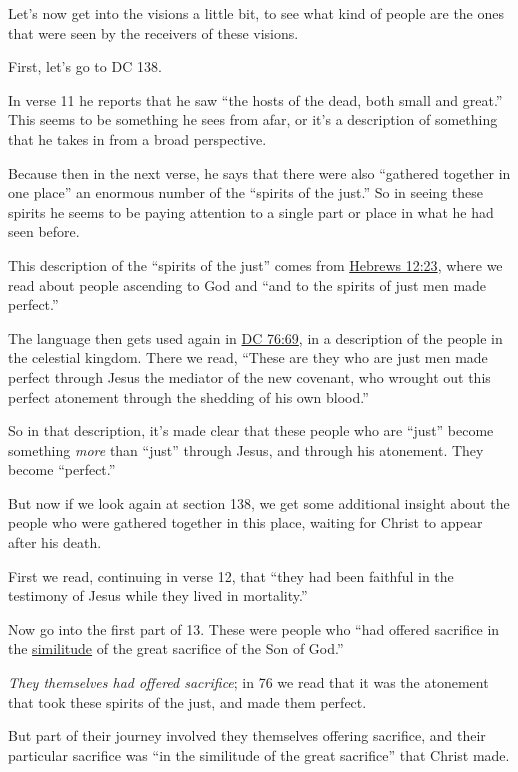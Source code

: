 \begin{compactitem}
			\item Let's now get into the visions a little bit, to see what kind of people are the ones that were seen by the receivers of these visions.
				\begin{compactitem}
					\item First, let's go to DC 138. 
					\item In verse 11 he reports that he saw ``the hosts of the dead, both small and great.'' This seems to be something he sees from afar, or it's a description of something that he takes in from a broad perspective.
					\item Because then in the next verse, he says that there were also ``gathered together in one place'' an enormous number of the ``spirits of the just.'' So in seeing these spirits he seems to be paying attention to a single part or place in what he had seen before.
					\item This description of the ``spirits of the just'' comes from \hyperref[HEBREWS-12-23]{Hebrews 12:23}, where we read about people ascending to God and ``and to the spirits of just men made perfect.''
					\item The language then gets used again in \hyperref[DC76-69]{DC 76:69}, in a description of the people in the celestial kingdom. There we read, ``These are they who are just men made perfect through Jesus the mediator of the new covenant, who wrought out this perfect atonement through the shedding of his own blood.''
					\item So in that description, it's made clear that these people who are ``just'' become something \textit{more} than ``just'' through Jesus, and through his atonement. They become ``perfect.''
					\item But now if we look again at section 138, we get some additional insight about the people who were gathered together in this place, waiting for Christ to appear after his death.
					\item First we read, continuing in verse 12, that ``they had been faithful in the testimony of Jesus while they lived in mortality.''
					\item Now go into the first part of 13. These were people who ``had offered sacrifice in the \hyperref[SIMILITUDE]{similitude} of the great sacrifice of the Son of God.''
					\item \textit{They themselves had offered sacrifice}; in 76 we read that it was the atonement that took these spirits of the just, and made them perfect. 
					\item But part of their journey involved they themselves offering sacrifice, and their particular sacrifice was ``in the similitude of the great sacrifice'' that Christ made.

\end{compactitem}
\end{compactitem}
